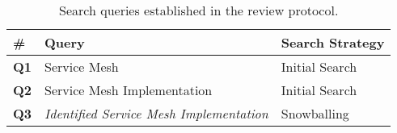 \begin{table}[t]
\centering
    \begin{tabularx}{\linewidth}{lXl}
    \toprule
    \# & Query & Search Strategy \\
    
    \midrule
    \textbf{Q1} & Service Mesh & Initial Search \\
    \textbf{Q2} & Service Mesh Implementation & Initial Search \\

    \midrule
    \textbf{Q3} & \textit{Identified Service Mesh Implementation} & Snowballing  \\
    
    \bottomrule
    \end{tabularx}
\caption{Search queries established in the review protocol.}
\label{tab:search-queries}
\end{table}

    

    
